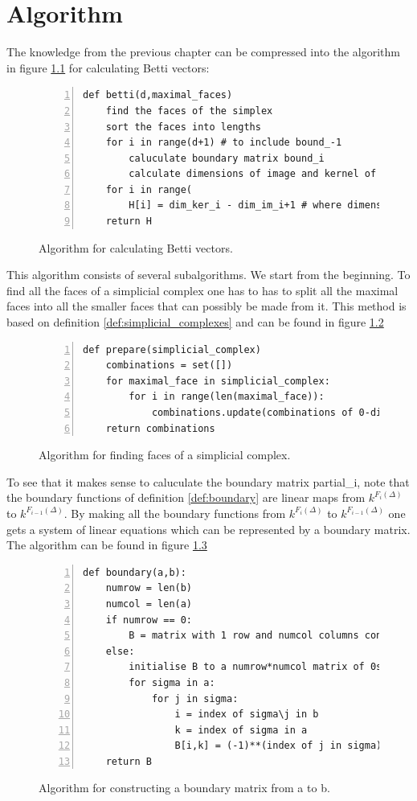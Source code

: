 \documentclass[11pt,a4paper,twoside, openright]{report}
\begin{document}
\chapter{Algorithm}\label{ch:algorithm}
The knowledge from the previous chapter can be compressed into the algorithm in figure \ref{fig:Algorithm} for calculating Betti vectors:
\begin{figure}[H]
\begin{lstlisting}[numbers=left]
def betti(d,maximal_faces)
    find the faces of the simplex 
    sort the faces into lengths
    for i in range(d+1) # to include bound_-1
        caluculate boundary matrix bound_i
        calculate dimensions of image and kernel of bound_i
    for i in range(  
        H[i] = dim_ker_i - dim_im_i+1 # where dimensions are 0 if not calculated
    return H
\end{lstlisting}
\caption{Algorithm for calculating Betti vectors.}
\label{fig:Algorithm}
\end{figure}
This algorithm consists of several subalgorithms. We start from the beginning. To find all the faces of a simplicial complex one has to has to split all the maximal faces into all the smaller faces that can possibly be made from it. This method is based on definition \ref{def:simplicial_complexes} and can be found in figure \ref{fig:Algorithm_faces}
\begin{figure}[H]
\begin{lstlisting}[numbers=left]
def prepare(simplicial_complex)
    combinations = set([])
    for maximal_face in simplicial_complex:
        for i in range(len(maximal_face)):
            combinations.update(combinations of 0-dimensional faces in maximal_face of length i)
    return combinations    
\end{lstlisting}
\caption{Algorithm for finding faces of a simplicial complex.}
\label{fig:Algorithm_faces}
\end{figure}
To see that it makes sense to caluculate the boundary matrix partial\_i, note that the boundary functions of definition \ref{def:boundary} are linear maps from $k^{F_i(\Delta)}$ to $k^{F_{i-1}(\Delta)}$. By making all the boundary functions from $k^{F_i(\Delta)}$ to $k^{F_{i-1}(\Delta)}$ one gets a system of linear equations which can be represented by a boundary matrix. The algorithm can be found in figure \ref{fig:Algorithm_matrix}
\begin{figure}[H]
\begin{lstlisting}[numbers=left]
def boundary(a,b):
    numrow = len(b)
    numcol = len(a)
    if numrow == 0:
        B = matrix with 1 row and numcol columns consisting of 1s
    else:
        initialise B to a numrow*numcol matrix of 0s 
        for sigma in a:
            for j in sigma:
                i = index of sigma\j in b
                k = index of sigma in a
                B[i,k] = (-1)**(index of j in sigma) 
    return B
\end{lstlisting}
\caption{Algorithm for constructing a boundary matrix from a to b.}
\label{fig:Algorithm_matrix}
\end{figure}
\end{document}
